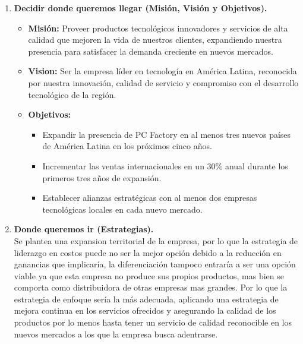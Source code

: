 \documentclass{templateNote}
\begin{document}
\begin{enumerate}[label=\alph*)]
    \newpage    
    \item \textbf{Decidir donde queremos llegar (Misión, Visión y Objetivos).} 
    \begin{itemize}
        \item \textbf{Misión:} Proveer productos tecnológicos innovadores y servicios de alta calidad que mejoren la vida de nuestros clientes, expandiendo nuestra presencia para satisfacer la demanda creciente en nuevos mercados.
        \item \textbf{Vision:} Ser la empresa líder en tecnología en América Latina, reconocida por nuestra innovación, calidad de servicio y compromiso con el desarrollo tecnológico de la región.
        \item \textbf{Objetivos:}
        \begin{itemize}
            \item Expandir la presencia de PC Factory en al menos tres nuevos países de América Latina en los próximos cinco años.
            \item Incrementar las ventas internacionales en un 30\% anual durante los primeros tres años de expansión.
            \item Establecer alianzas estratégicas con al menos dos empresas tecnológicas locales en cada nuevo mercado.
        \end{itemize}
    \end{itemize}

    \item \textbf{Donde queremos ir (Estrategias).} \\
    \noindent Se plantea una expansion territorial de la empresa, por lo que la estrategia de liderazgo en costos puede no ser la mejor opción debido a la reducción en ganancias que implicaría, la diferenciación tampoco entraría a ser una opción viable ya que esta empresa no produce sus propios productos, mas bien se comporta como distribuidora de otras empresas mas grandes. Por lo que la estrategia de enfoque sería la más adecuada, aplicando una estrategia de mejora continua en los servicios ofrecidos y asegurando la calidad de los productos por lo menos hasta tener un servicio de calidad reconocible en los nuevos mercados a los que la empresa busca adentrarse.


\end{enumerate}
\end{document}
